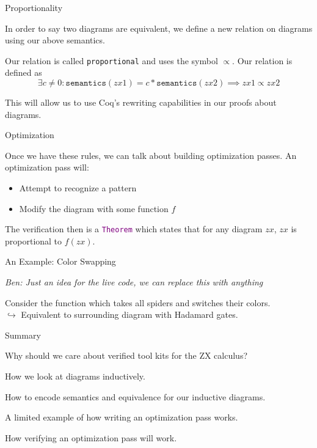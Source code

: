 \documentclass{beamer}
\newcommand{\ben}[1]{\textit{\textcolor{egreen}{Ben: #1}}}
\newcommand{\ben}[1]{}
\begin{document}
\begin{frame}{Proportionality}

    In order to say two diagrams are \alert{equivalent}, we define a new relation on diagrams using our above semantics.
    
    Our relation is called \alert{\texttt{proportional}} and uses the symbol $\propto$. Our relation is defined as
    \[
        \exists c \neq 0: \texttt{semantics}(zx1) = c * \texttt{semantics}(zx2) \implies zx1 \propto zx2
    \]
    
    This will allow us to use Coq's \alert{rewriting capabilities} in our proofs about diagrams.

\end{frame}

\begin{frame}{Optimization}

    Once we have these rules, we can talk about building optimization passes. An optimization pass will: 
    
    \begin{itemize}
        \item Attempt to \alert{recognize a pattern}
        \item \alert{Modify the diagram} with some function $f$
    \end{itemize}
    
    The verification then is a \textcolor{purple}{\texttt{Theorem}} which states that for any diagram $zx$, $zx$ is proportional to $f(zx)$.
    
\end{frame}

\begin{frame}{An Example: Color Swapping}

    \ben{Just an idea for the live code, we can replace this with anything}

    Consider the function which takes all spiders and \alert{switches their colors}.\\
    \(\hookrightarrow\) Equivalent to \alert{surrounding diagram with Hadamard gates}.
    
   
\end{frame}

\begin{frame}{Summary}

         Why should we care about verified tool kits for the ZX calculus?
         
         How we look at diagrams inductively.
         
         How to encode semantics and equivalence for our inductive diagrams.
         
         A limited example of how writing an optimization pass works.
         
         How verifying an optimization pass will work.

\end{frame}
\end{document}
